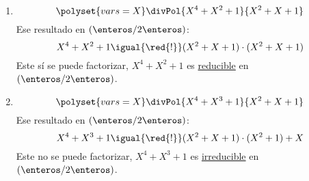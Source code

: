 \begin{enumerate}[label=\roman*)]
\begin{enumerate}[label=(\alph*)]
          \item
                $$
                  \polyset{vars=X}
                  \divPol{X^4 + X^2 + 1}{X^2 + X + 1}
                $$
                Ese resultado en $(\enteros/2\enteros)$:
                $$
                  X^4 + X^2 + 1 \igual{\red{!}} (X^2 + X + 1)\cdot(X^2 + X + 1)
                $$
                Este sí se puede factorizar, $X^4 + X^2 + 1$ es \ul{reducible} en $(\enteros/2\enteros)$.

          \item
                $$
                  \polyset{vars=X}
                  \divPol{X^4 + X^3 + 1}{X^2 + X + 1}
                $$
                Ese resultado en $(\enteros/2\enteros)$:
                $$
                  X^4 + X^3 + 1 \igual{\red{!}} (X^2 + X + 1)\cdot(X^2 + 1) + X
                $$
                Este no se puede factorizar, $X^4 + X^3 + 1$ es \ul{irreducible} en $(\enteros/2\enteros)$.
        \end{enumerate}
\end{enumerate}

\begin{aportes}
  \item {}
  \item {}
\end{aportes}
